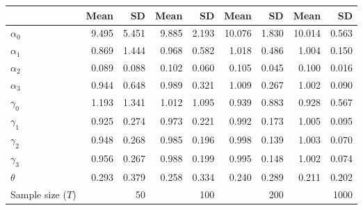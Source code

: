 
\begin{tabular}[t]{lrrrrrrrr}
\toprule
  & Mean & SD & Mean  & SD  & Mean   & SD   & Mean    & SD   \\
\midrule
$\alpha_{0}$ & 9.495 & 5.451 & 9.885 & 2.193 & 10.076 & 1.830 & 10.014 & 0.563\\
$\alpha_{1}$ & 0.869 & 1.444 & 0.968 & 0.582 & 1.018 & 0.486 & 1.004 & 0.150\\
$\alpha_{2}$ & 0.089 & 0.088 & 0.102 & 0.060 & 0.105 & 0.045 & 0.100 & 0.016\\
$\alpha_{3}$ & 0.944 & 0.648 & 0.989 & 0.321 & 1.009 & 0.267 & 1.002 & 0.090\\
$\gamma_{0}$ & 1.193 & 1.341 & 1.012 & 1.095 & 0.939 & 0.883 & 0.928 & 0.567\\
$\gamma_{1}$ & 0.925 & 0.274 & 0.973 & 0.221 & 0.992 & 0.173 & 1.005 & 0.095\\
$\gamma_{2}$ & 0.948 & 0.268 & 0.985 & 0.196 & 0.998 & 0.139 & 1.003 & 0.070\\
$\gamma_{3}$ & 0.956 & 0.267 & 0.988 & 0.199 & 0.995 & 0.148 & 1.002 & 0.074\\
$\theta$ & 0.293 & 0.379 & 0.258 & 0.334 & 0.240 & 0.289 & 0.211 & 0.202\\
Sample size ($T$) &  & 50 &  & 100 &  & 200 &  & 1000\\
\bottomrule
\end{tabular}
